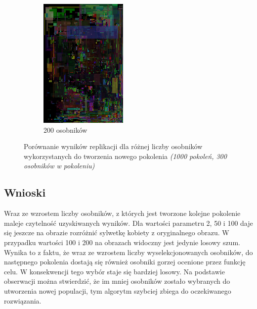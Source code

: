 \begin{figure}[!htb]
\begin{subfigure}[b]{0.3\textwidth}
         \includegraphics[width=\textwidth]{images/mona/num_of_best/200.png}
         \caption{200 osobników}
    \end{subfigure}
    \caption{Porównanie wyników replikacji dla różnej liczby osobników wykorzystanych do tworzenia nowego pokolenia \textit{(1000 pokoleń, 300 osobników w pokoleniu)}}
    \label{fig:num_of_best}
\end{figure}

\subsection{Wnioski}
Wraz ze wzrostem liczby osobników, z których jest tworzone kolejne pokolenie maleje czytelność uzyskiwanych wyników. Dla wartości parametru 2, 50 i 100 daje się jeszcze na obrazie rozróżnić sylwetkę kobiety z oryginalnego obrazu. W przypadku wartości 100 i 200 na obrazach widoczny jest jedynie losowy szum. Wynika to z faktu, że wraz ze wzrostem liczby wyselekcjonowanych osobników, do następnego pokolenia dostają się również osobniki gorzej ocenione przez funkcję celu. W konsekwencji tego wybór staje się bardziej losowy. Na podstawie obserwacji można stwierdzić, że im mniej osobników zostało wybranych do utworzenia nowej populacji, tym algorytm szybciej zbiega do oczekiwanego rozwiązania.


